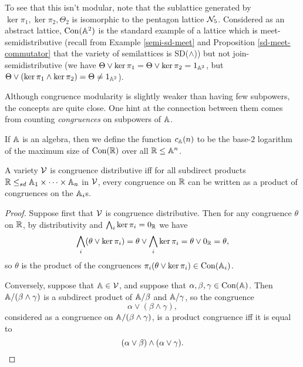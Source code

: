 \documentclass[letterpaper,11pt]{article}
\DeclareMathOperator{\Con}{Con}
\begin{document}
\begin{ex}
\begin{center}
\end{center}
To see that this isn't modular, note that the sublattice generated by $\ker \pi_1, \ker \pi_2, \Theta_2$ is isomorphic to the pentagon lattice $\mathcal{N}_5$. Considered as an abstract lattice, $\Con(\bA^2)$ is the standard example of a lattice which is meet-semidistributive (recall from Example \ref{semi-sd-meet} and Proposition \ref{sd-meet-commutator} that the variety of semilattices is SD($\wedge$)) but not join-semidistributive (we have $\Theta \vee \ker \pi_1 = \Theta \vee \ker \pi_2 = 1_{\mathbb{A}^2}$, but $\Theta \vee (\ker \pi_1 \wedge \ker \pi_2) = \Theta \ne 1_{\mathbb{A}^2}$).
\end{ex}

Although congruence modularity is slightly weaker than having few subpowers, the concepts are quite close. One hint at the connection between them comes from counting \emph{congruences} on subpowers of $\mathbb{A}$.

\begin{defn} If $\mathbb{A}$ is an algebra, then we define the function $c_{\mathbb{A}}(n)$ to be the base-$2$ logarithm of the maximum size of $\Con(\RR)$ over all $\mathbb{R} \le \mathbb{A}^n$.
\end{defn}

\begin{prop} A variety $\mathcal{V}$ is congruence distributive iff for all subdirect products $\mathbb{R} \le_{sd} \mathbb{A}_1 \times \cdots \times \mathbb{A}_n$ in $\mathcal{V}$, every congruence on $\mathbb{R}$ can be written as a product of congruences on the $\mathbb{A}_i$s.
\end{prop}
\begin{proof} Suppose first that $\mathcal{V}$ is congruence distributive. Then for any congruence $\theta$ on $\mathbb{R}$, by distributivity and $\bigwedge_i \ker \pi_i = 0_{\mathbb{R}}$ we have
\[
\bigwedge_i (\theta \vee \ker \pi_i) = \theta \vee \bigwedge_i \ker \pi_i = \theta \vee 0_{\mathbb{R}} = \theta,
\]
so $\theta$ is the product of the congruences $\pi_i(\theta \vee \ker \pi_i) \in \Con(\bA_i)$.

Conversely, suppose that $\mathbb{A} \in \mathcal{V}$, and suppose that $\alpha, \beta, \gamma \in \Con(\bA)$. Then $\mathbb{A}/(\beta \wedge \gamma)$ is a subdirect product of $\mathbb{A}/\beta$ and $\mathbb{A}/\gamma$, so the congruence
\[
\alpha \vee (\beta \wedge \gamma),
\]
considered as a congruence on $\mathbb{A}/(\beta \wedge \gamma)$, is a product congruence iff it is equal to
\[
(\alpha \vee \beta) \wedge (\alpha \vee \gamma).\qedhere
\]
\end{proof}
\end{document}
